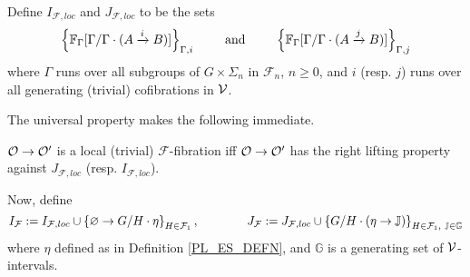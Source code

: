 \documentclass[a4paper,10pt
,draft
]{article}%
\renewcommand{\F}{\mathcal F}
\newcommand{\J}{\mathbb J}
\renewcommand{\1}{\eta}%
\begin{document}
Define $I_{\F,loc}$ and $J_{\F, loc}$ to be the sets
\begin{equation}
      \label{FGAMMA_EQ}
      \left\{\mathbb F_\Gamma[\Gamma/\Gamma \cdot (A \xrightarrow{i} B)]\right\}_{\Gamma, i}
      \qquad \mbox{ and } \qquad
      \left\{\mathbb F_\Gamma[\Gamma/\Gamma \cdot (A \xrightarrow{j} B)]\right\}_{\Gamma,j}
\end{equation}
where $\Gamma$ runs over all subgroups of $G \times \Sigma_n$ in $\F_n$, $n \geq 0$,
and $i$ (resp. $j$) runs over all generating (trivial) cofibrations in $\mathcal V$.

The universal property makes the following immediate.
\begin{corollary}
      $\mathcal{O} \to \mathcal{O}'$ is a local (trivial) $\F$-fibration iff
      $\mathcal{O} \to \mathcal{O}'$ has the right lifting property against $J_{\F, loc}$ (resp. $I_{\F, loc}$).
\end{corollary}

Now, define
\begin{equation}
      \label{IFJF_EQ}
      I_{\F}:= I_{\F, loc} \mathbin{\cup} \set{\varnothing \to G/H \cdot \1}_{H \in \F_1},
      \qquad \qquad
      J_{\F} := J_{\F, loc} \mathbin{\cup} \set{G/H \cdot (\1 \to \J)}_{H \in \F_1,\ \J\in\mathbb{G}}
\end{equation}
where $\1$ defined as in Definition \ref{PL_ES_DEFN}, and $\mathbb{G}$ is a generating set of $\mathcal V$-intervals. 
\end{document}
